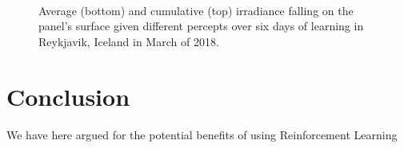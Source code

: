 \documentclass{article}
\begin{document}
\begin{figure}
\begin{center}
	 \\ %
	 \hspace{1mm} %
	 \hspace{1mm} %
\caption{Average (bottom) and cumulative (top) irradiance falling on the panel's surface given different percepts over six days of learning in Reykjavik, Iceland in March of 2018.}
\label{fig:results_ice}
\end{center}
\end{figure}


\section{Conclusion}

We have here argued for the potential benefits of using Reinforcement Learning 










\end{document}

